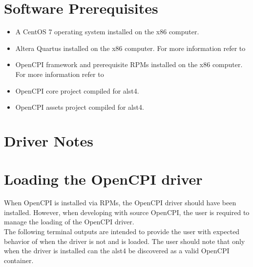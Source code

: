 \section{Software Prerequisites}
\begin{itemize}
\item A CentOS 7 operating system installed on the x86 computer.
\item Altera Quartus installed on the x86 computer. For more information refer to \cite{fpga_vendor_tool_guide}
\item OpenCPI framework and prerequisite RPMs installed on the x86 computer. For more information refer to \cite{rpm_installation_guide}
\item OpenCPI core project compiled for alst4.
\item OpenCPI assets project compiled for alst4.
\end{itemize}



\section{Driver Notes}


\section{Loading the OpenCPI driver}
When OpenCPI is installed via RPMs, the OpenCPI driver should have been installed. However, when developing with source OpenCPI, the user is required to manage the loading of the OpenCPI driver. \\
The following terminal outputs are intended to provide the user with expected behavior of when the driver is not and is loaded. The user should note that only when the driver is installed can the alst4 be discovered as a valid OpenCPI container.


